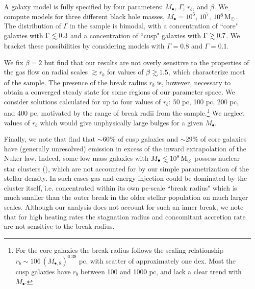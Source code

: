 \documentclass[usenatbib,fleqn]{mn2e}
\newcommand\lsim{\mathrel{\rlap{\lower4pt\hbox{\hskip1pt$\sim$}}
    \raise1pt\hbox{$<$}}}
\newcommand\gsim{\mathrel{\rlap{\lower4pt\hbox{\hskip1pt$\sim$}}
    \raise1pt\hbox{$>$}}}
\newcommand{\rb}{r_b}
\newcommand{\Mbh}[1][]{M_{\bullet#1}}
\newcommand{\Mbheight}{M_{\bullet,8}}
\begin{document}
A galaxy model is fully specified by four parameters: $\Mbh$,
$\Gamma$, $r_b$, and $\beta$.  We compute models for three different
black hole masses, $\Mbh = 10^6$, $10^7$, $10^8 \,{\rm M_\odot}$.  The
distribution of $\Gamma$ in the \citet{LauerFaber+:2007a} sample is
bimodal, with a concentration of ``core" galaxies with $\Gamma \lsim
0.3$ and a concentration of ``cusp" galaxies with $\Gamma \gsim 0.7$.
We bracket these possibilities by considering models with $\Gamma=0.8$
and $\Gamma=0.1$.  

We fix $\beta = 2$ but find that our results are not overly sensitive to
the properties of the gas flow on radial scales $\gtrsim r_b$ for values of
$\beta\gsim 1.5$, which characterize most of the \citet{LauerFaber+:2007a} sample.  The
presence of the break radius $r_{b}$ is, however, necessary to obtain
a converged steady state for some regions of our parameter space.  We
consider solutions calculated for up to four values of $\rb$: 50 pc,
100 pc, 200 pc, and 400 pc, motivated by the range of break radii from
the \citet{LauerFaber+:2007a} sample.\footnote{For the core galaxies
  the break radius follows the scaling relationship $\rb\sim 106 \,
  (\Mbheight)^{0.39}$ pc, with scatter of approximately one dex.  Most
  the cusp galaxies have $\rb$ between 100 and 1000 pc, and lack a
  clear trend with $\Mbh$.}  We neglect values of $r_b$ which would
give unphysically large bulges for a given $\Mbh$.



Finally, we note that \citealt{LauerFaber+:2005a} find that $\sim 60\%$ of cusp galaxies and $\sim29\%$ of core galaxies have (generally unresolved) emission in excess of the inward extrapolation of the Nuker law.  Indeed, some low mass galaxies with $\Mbh\lsim 10^{8} \Msun$ possess nuclear star clusters (\citealt{GrahamSpitler:2009a}), which are not accounted for by our simple parametrization of the stellar density.  In such cases gas and energy injection could be dominated by the cluster itself, i.e. concentrated within its own pc-scale ``break radius" which is much smaller than the outer break in the older stellar population on much larger scales.  Although our analysis does not account for such an inner break, we note that for high heating rates the stagnation radius and concomitant accretion rate are not sensitive to the break radius.
\end{document}
